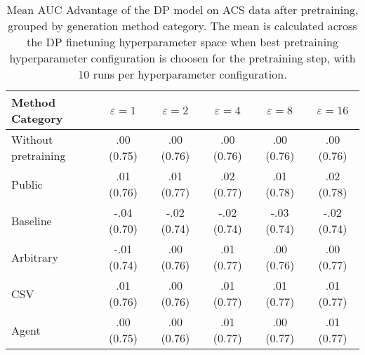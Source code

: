 \begin{table}[h!]
    \centering
    \caption{Mean AUC Advantage of the DP model on ACS data after pretraining, grouped by generation method category. The mean is calculated across the DP finetuning hyperparameter space when best pretraining hyperparameter configuration is choosen for the pretraining step, with 10 runs per hyperparameter configuration.}
    \label{tab:epsilon_comparison}
    \begin{tabular}{lccccc}
    \toprule
    Method Category & $\varepsilon=1$ & $\varepsilon=2$ & $\varepsilon=4$ & $\varepsilon=8$ & $\varepsilon=16$ \\
    \midrule
    Without pretraining & .00 {\small (0.75)} & .00 {\small (0.76)} & .00 {\small (0.76)} & .00 {\small (0.76)} & .00 {\small (0.76)} \\
    \arrayrulecolor{black!50!}\midrule
    Public & \cellcolor{gold!30}.01 {\small (0.76)} & \cellcolor{gold!30}.01 {\small (0.77)} & \cellcolor{gold!30}.02 {\small (0.77)} & \cellcolor{gold!30}.01 {\small (0.78)} & \cellcolor{gold!30}.02 {\small (0.78)} \\
    \arrayrulecolor{black!50!}\midrule
    Baseline & -.04 {\small (0.70)} & -.02 {\small (0.74)} & -.02 {\small (0.74)} & -.03 {\small (0.74)} & -.02 {\small (0.74)} \\
    \arrayrulecolor{black!50!}\midrule
    Arbitrary & -.01 {\small (0.74)} & \cellcolor{bronze!30}.00 {\small (0.76)} & \cellcolor{bronze!30}.01 {\small (0.77)} & .00 {\small (0.76)} & .00 {\small (0.77)} \\
    \arrayrulecolor{black!50!}\midrule
    CSV & \cellcolor{silver!30}.01 {\small (0.76)} & \cellcolor{silver!30}.00 {\small (0.76)} & \cellcolor{silver!30}.01 {\small (0.77)} & \cellcolor{silver!30}.01 {\small (0.77)} & \cellcolor{silver!30}.01 {\small (0.77)} \\
    Agent & \cellcolor{bronze!30}.00 {\small (0.75)} & \cellcolor{bronze!30}.00 {\small (0.76)} & \cellcolor{bronze!30}.01 {\small (0.77)} & \cellcolor{bronze!30}.00 {\small (0.77)} & \cellcolor{bronze!30}.01 {\small (0.77)} \\
    \bottomrule
    \end{tabular}
\end{table}